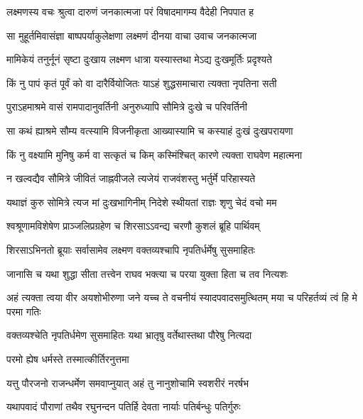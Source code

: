 
\twolineshloka
{लक्ष्मणस्य वचः श्रुत्वा दारुणं जनकात्मजा}
{परं विषादमागम्य वैदेही निपपात ह} %

\twolineshloka
{सा मुहूर्तमिवासंज्ञा बाष्पपर्याकुलेक्षणा}
{लक्ष्मणं दीनया वाचा उवाच जनकात्मजा} %

\twolineshloka
{मामिकेयं तनुर्नूनं सृष्टा दुःखाय लक्ष्मण}
{धात्रा यस्यास्तथा मेऽद्य दुःखमूर्तिः प्रदृश्यते} %

\twolineshloka
{किं नु पापं कृतं पूर्वं को वा दारैर्वियोजितः}
{याऽहं शुद्धसमाचारा त्यक्ता नृपतिना सती} %

\twolineshloka
{पुराऽहमाश्रमे वासं रामपादानुवर्तिनी}
{अनुरुध्यापि सौमित्रे दुःखे च परिवर्तिनी} %

\twolineshloka
{सा कथं ह्याश्रमे सौम्य वत्स्यामि विजनीकृता}
{आख्यास्यामि च कस्याहं दुःखं दुःखपरायणा} %

\twolineshloka
{किं नु वक्ष्यामि मुनिषु कर्म वा सत्कृतं च किम्}
{कस्मिंश्चित् कारणे त्यक्ता राघवेण महात्मना} %

\twolineshloka
{न खल्वद्यैव सौमित्रे जीवितं जाह्नवीजले}
{त्यजेयं राजवंशस्तु भर्तुर्मे परिहास्यते} %

\twolineshloka
{यथाज्ञं कुरु सोमित्रे त्यज मां दुःखभागिनीम्}
{निदेशे स्थीयतां राज्ञः शृणु चेदं वचो मम} %

\twolineshloka
{श्वश्रूणामविशेषेण प्राञ्जलिप्रग्रहेण च}
{शिरसाऽऽवन्द्य चरणौ कुशलं ब्रूहि पार्थिवम्} %

\twolineshloka
{शिरसाऽभिनतो ब्रूयाः सर्वासामेव लक्ष्मण}
{वक्तव्यश्चापि नृपतिर्धर्मेषु सुसमाहितः} %

\twolineshloka
{जानासि च यथा शुद्धा सीता तत्त्वेन राघव}
{भक्त्या च परया युक्ता हिता च तव नित्यशः} %

\threelineshloka
{अहं त्यक्ता त्वया वीर अयशोभीरुणा जने}
{यच्च ते वचनीयं स्यादपवादसमुत्थितम्}
{मया च परिहर्तव्यं त्वं हि मे परमा गतिः} %

\twolineshloka
{वक्तव्यश्चेति नृपतिर्धमेण सुसमाहितः}
{यथा भ्रातृषु वर्तेथास्तथा पौरेषु नित्यदा} %

\onelineshloka
{परमो ह्येष धर्मस्ते तस्मात्कीर्तिरनुत्तमा} %

\twolineshloka
{यत्तु पौरजनो राजन्धर्मेण समवाप्नुयात्}
{अहं तु नानुशोचामि स्वशरीरं नरर्षभ} %

\twolineshloka
{यथापवादं पौराणां तथैव रघुनन्दन}
{पतिर्हि देवता नार्याः पतिर्बन्धुः पतिर्गुरुः} %

